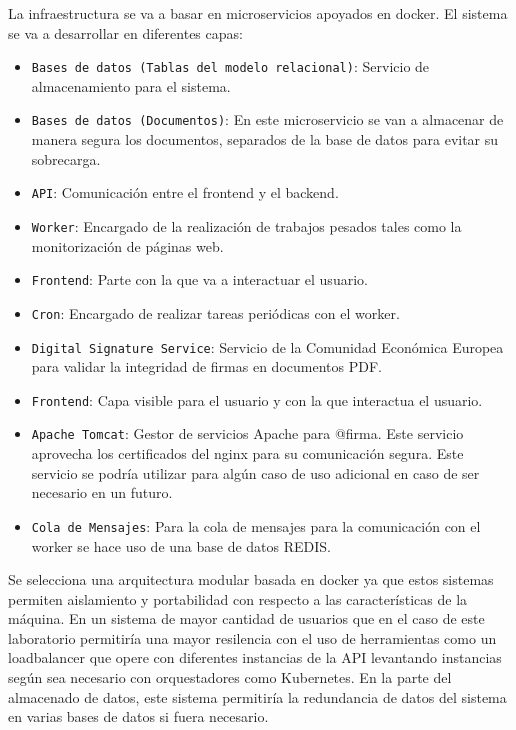 La infraestructura se va a basar en microservicios apoyados en docker. El sistema se va a desarrollar en diferentes capas: 
\begin{itemize}
  \item \texttt{Bases de datos (Tablas del modelo relacional)}: Servicio de almacenamiento para el sistema.
  \item \texttt{Bases de datos (Documentos)}: En este microservicio se van a almacenar de manera segura los documentos, separados de la base de datos para evitar su sobrecarga.
  \item \texttt{API}: Comunicación entre el frontend y el backend.
  \item \texttt{Worker}: Encargado de la realización de trabajos pesados tales como la monitorización de páginas web.
  \item \texttt{Frontend}: Parte con la que va a interactuar el usuario. 
  \item \texttt{Cron}: Encargado de realizar tareas periódicas con el worker.
  \item \texttt{Digital Signature Service}: Servicio de la Comunidad Económica Europea para validar la integridad de firmas en documentos PDF.
  \item \texttt{Frontend}: Capa visible para el usuario y con la que interactua el usuario. 
  \item \texttt{Apache Tomcat}: Gestor de servicios Apache para @firma. Este servicio aprovecha los certificados del nginx para su comunicación segura. Este servicio se podría utilizar para algún caso de uso adicional en caso de ser necesario en un futuro.  
  \item \texttt{Cola de Mensajes}: Para la cola de mensajes para la comunicación con el worker se hace uso de una base de datos REDIS. 
\end{itemize}

Se selecciona una arquitectura modular basada en docker ya que estos sistemas permiten aislamiento y portabilidad con respecto a las características de la máquina. En un sistema de mayor cantidad de usuarios que en el caso de este laboratorio permitiría una mayor resilencia con el uso de herramientas como un loadbalancer que opere con diferentes instancias de la API levantando instancias según sea necesario con orquestadores como Kubernetes. En la parte del almacenado de datos, este sistema permitiría la redundancia de datos del sistema en varias bases de datos si fuera necesario.

